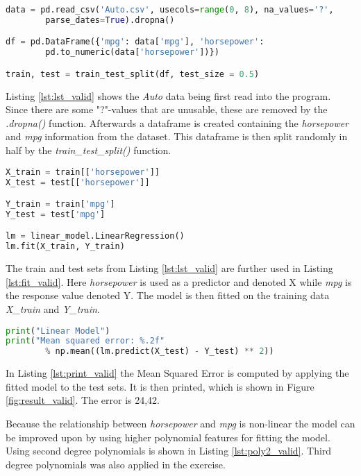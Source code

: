 \begin{lstlisting}[language=Python, label=lst:lst_valid, caption=Auto dataset randomly split]
data = pd.read_csv('Auto.csv', usecols=range(0, 8), na_values='?',
		parse_dates=True).dropna()

df = pd.DataFrame({'mpg': data['mpg'], 'horsepower':  
		pd.to_numeric(data['horsepower'])})

train, test = train_test_split(df, test_size = 0.5)
\end{lstlisting}
Listing \ref{lst:lst_valid} shows the \emph{Auto} data being first read into the program. Since there are some "?"-values that are unusable, these are removed by the \emph{.dropna()} function.
Afterwards a dataframe is created containing the \emph{horsepower} and \emph{mpg} information from the dataset. This dataframe is then split randomly in half by the \emph{train\_test\_split()} function. 

\begin{lstlisting}[language=Python, label=lst:fit_valid, caption=Fit linear regression]
X_train = train[['horsepower']]
X_test = test[['horsepower']]

Y_train = train['mpg']
Y_test = test['mpg']

lm = linear_model.LinearRegression()
lm.fit(X_train, Y_train)
\end{lstlisting}

The train and test sets from Listing \ref{lst:lst_valid} are further used in Listing \ref{lst:fit_valid}. Here \emph{horsepower} is used as a predictor and denoted X while \emph{mpg} is the response value denoted Y. The model is then fitted on the training data \emph{X\_train} and \emph{Y\_train}.

\begin{lstlisting}[language=Python, label=lst:print_valid, caption=Fit linear regression]
print("Linear Model")
print("Mean squared error: %.2f" 
		% np.mean((lm.predict(X_test) - Y_test) ** 2))
\end{lstlisting}

In Listing \ref{lst:print_valid} the Mean Squared Error is computed by applying the fitted model to the test sets. It is then printed, which is shown in Figure \ref{fig:result_valid}. The error is 24,42. 

Because the relationship between \emph{horsepower} and \emph{mpg} is non-linear the model can be improved upon by using higher polynomial features for fitting the model. Using second degree polynomials is shown in Listing \ref{lst:poly2_valid}. Third degree polynomials was also applied in the exercise.

